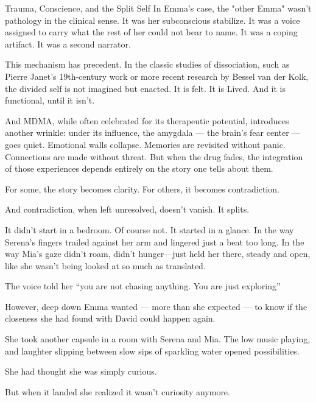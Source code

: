\begin{PsychologicalSidebar}{Trauma, Conscience, and the Split Self}
In Emma’s case, the "other Emma" wasn’t pathology in the clinical sense. It was her subconscious 
stabilize. It was a voice assigned to carry what the rest of her could not bear to name. It was a coping 
artifact. It was a second narrator.

\medskip


This mechanism has precedent. In the classic studies of dissociation, such as Pierre Janet’s 19th-century 
work or more recent research by Bessel van der Kolk, the divided self is not imagined but enacted. It 
is felt. It is Lived. And it is functional, until it isn’t.

\medskip


And MDMA, while often celebrated for its therapeutic potential, introduces another wrinkle: under 
its influence, the amygdala --- the brain’s fear center --- goes quiet. Emotional walls collapse. 
Memories are revisited without panic. Connections are made without threat. But when the drug fades, 
the integration of those experiences depends entirely on the story one tells about them.

\medskip


For some, the story becomes clarity. For others, it becomes contradiction.

\medskip


And contradiction, when left unresolved, doesn’t vanish. It splits.

\end{PsychologicalSidebar}

\medskip

It didn’t start in a bedroom.
Of course not.
It started in a glance. In the way Serena’s fingers trailed against her arm and lingered just a beat too long.
In the way Mia’s gaze didn’t roam, didn’t hunger—just held her there, steady and open, 
like she wasn’t being looked at so much as translated.

The voice told her ``you are not chasing anything. You are just exploring''

However, deep down Emma wanted --- more than she expected --- to know 
if the closeness she had found with David could happen again.

She took another capsule in a room with Serena and Mia. The low music playing, and laughter 
slipping between slow sips of sparkling water opened possibilities.

She had thought she was simply curious.

But when it landed she realized it wasn’t curiosity anymore.

